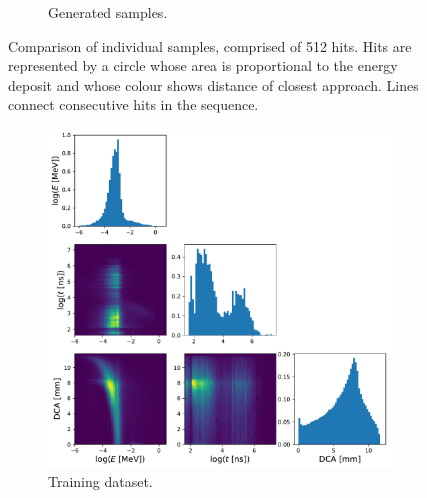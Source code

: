 \begin{figure}
\begin{subfigure}[t]{0.48\textwidth}
        \caption{Generated samples.}
    \end{subfigure}
    \caption{
        Comparison of individual samples, comprised of 512 hits. Hits are
        represented by a circle whose area is proportional to the energy deposit
        and whose colour shows distance of closest approach. 
        Lines connect consecutive hits in the sequence.
    }
    \label{fig:comp_uncurated}
\end{figure}

\begin{figure}
    \centering
    \begin{subfigure}[t]{0.48\textwidth}
        \centering
        \hspace{-1cm} %
        \includegraphics[width=\textwidth]{chapter4/feature_matrix_real.pdf}
        \caption{Training dataset.}
    \end{subfigure}
    \quad
    \begin{subfigure}[t]{0.48\textwidth}
        \centering
        \hspace{-1cm} %

\end{subfigure}
\end{figure}
